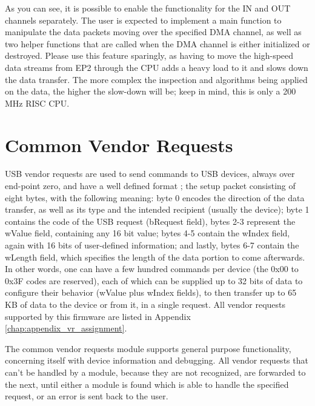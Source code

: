 \documentclass[a4paper,12pt]{report}
\begin{document}
As you can see, it is possible to enable the functionality for the IN and OUT channels separately. The user is expected to implement a main function to manipulate the data packets moving over the specified DMA channel, as well as two helper functions that are called when the DMA channel is either initialized or destroyed.
Please use this feature sparingly, as having to move the high-speed data streams from EP2 through the CPU adds a heavy load to it and slows down the data transfer. The more complex the inspection and algorithms being applied on the data, the higher the slow-down will be; keep in mind, this is only a 200 MHz RISC CPU.

\section{Common Vendor Requests} \label{sec:common_vendor_requests}

USB vendor requests are used to send commands to USB devices, always over end-point zero, and have a well defined format \cite{USB_Nutshell}; the setup packet consisting of eight bytes, with the following meaning: byte 0 encodes the direction of the data transfer, as well as its type and the intended recipient (usually the device); byte 1 contains the code of the USB request (bRequest field), bytes 2-3 represent the wValue field, containing any 16 bit value; bytes 4-5 contain the wIndex field, again with 16 bits of user-defined information; and lastly, bytes 6-7 contain the wLength field, which specifies the length of the data portion to come afterwards. In other words, one can have a few hundred commands per device (the 0x00 to 0x3F codes are reserved), each of which can be supplied up to 32 bits of data to configure their behavior (wValue plus wIndex fields), to then transfer up to 65 KB of data to the device or from it, in a single request. All vendor requests supported by this firmware are listed in Appendix \ref{chap:appendix_vr_assignment}.

The common vendor requests module supports general purpose functionality, concerning itself with device information and debugging. All vendor requests that can't be handled by a module, because they are not recognized, are forwarded to the next, until either a module is found which is able to handle the specified request, or an error is sent back to the user.
\end{document}
